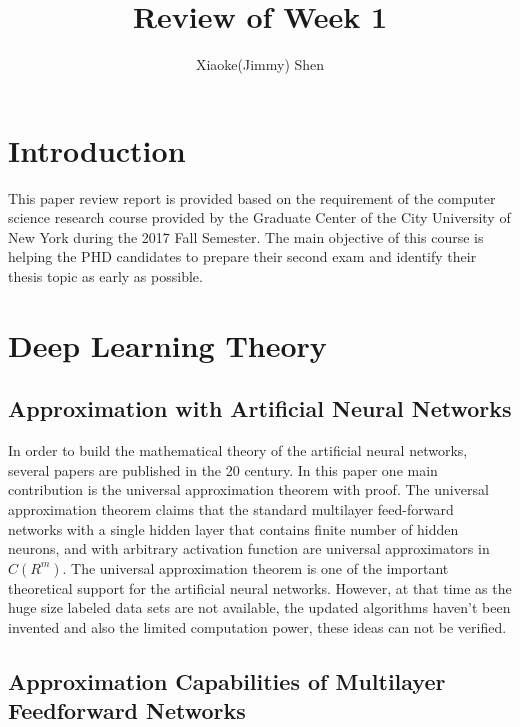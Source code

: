 \documentclass[a4paper,12pt]{article}
\begin{document}
\renewcommand\labelenumi{(\theenumi)}
\renewcommand{\vec}[1]{\mathbf{#1}}
\title {Review of Week 1 }
\author{Xiaoke(Jimmy) Shen}
\maketitle
\section{Introduction}

This paper review report is provided based on the requirement of the computer science research course provided by the Graduate Center of the City University of New York during the 2017 Fall Semester. The main objective of this course is helping the PHD candidates to prepare their second exam and identify their thesis topic as early as possible\cite{ji2017}. \\

\section{Deep Learning Theory}
\subsection{Approximation with Artificial Neural Networks \cite{csaji2001}}
In order to build the mathematical theory of the artificial neural networks, several papers are published in the 20 century. In this paper one main contribution is the universal approximation theorem with proof. The universal approximation theorem claims \cite{csaji2001}  that the standard multilayer feed-forward networks with a single hidden layer that contains finite number of hidden neurons, and with arbitrary activation function are universal approximators in $C(R^m)$.  The universal approximation theorem is one of the important theoretical support for the artificial neural networks. However, at that time as the huge size labeled data sets are not available, the updated algorithms haven't been invented and also the limited computation power, these ideas can not be verified.


\subsection{Approximation Capabilities of Multilayer Feedforward Networks \cite{hornik1991} }
\end{document}
